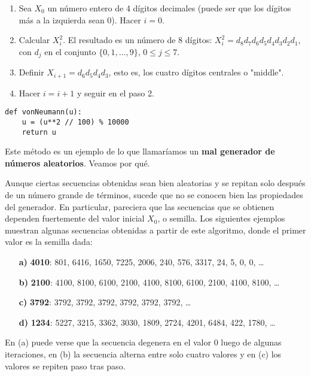 \documentclass[11pt, a4paper]{article}
\theoremstyle{definition}
\begin{document}
\begin{enumerate}
    \item Sea $X_{0}$ un número entero de 4 dígitos decimales (puede ser que los dígitos más a la izquierda sean 0). Hacer $i=0$.
    
    \item Calcular $X_{i}^{2}$. El resultado es un número de 8 dígitos: $X_{i}^{2}=d_{8}d_{7}d_{6}d_{5}d_{4}d_{3}d_{2}d_{1}$, con $d_{j}$ en el conjunto $\{0,1,\ldots,9\}$, $0\leq j\leq 7$.
    
    \item Definir $X_{i+1}=d_{6}d_{5}d_{4}d_{3}$, esto es, los cuatro dígitos centrales o "middle".
    
    \item Hacer $i=i+1$ y seguir en el paso 2.
\end{enumerate}

\begin{verbatim}
def vonNeumann(u):
    u = (u**2 // 100) % 10000
    return u
\end{verbatim}

Este método es un ejemplo de lo que llamaríamos un \textbf{mal generador de números aleatorios}. Veamos por qué.

Aunque ciertas secuencias obtenidas sean bien aleatorias y se repitan solo después de un número grande de términos, sucede que no se conocen bien las propiedades del generador. En particular, pareciera que las secuencias que se obtienen dependen fuertemente del valor inicial $X_{0}$, o semilla. Los siguientes ejemplos muestran algunas secuencias obtenidas a partir de este algoritmo, donde el primer valor es la semilla dada:

\begin{itemize}
    \item[\textbf{a)}] \textbf{4010}: 801, 6416, 1650, 7225, 2006, 240, 576, 3317, 24, 5, 0, 0, \ldots
    
    \item[\textbf{b)}] \textbf{2100}: 4100, 8100, 6100, 2100, 4100, 8100, 6100, 2100, 4100, 8100, \ldots
    
    \item[\textbf{c)}] \textbf{3792}: 3792, 3792, 3792, 3792, 3792, 3792, \ldots
    
    \item[\textbf{d)}] \textbf{1234}: 5227, 3215, 3362, 3030, 1809, 2724, 4201, 6484, 422, 1780, \ldots
\end{itemize}

En (a) puede verse que la secuencia degenera en el valor 0 luego de algunas iteraciones, en (b) la secuencia alterna entre solo cuatro valores y en (c) los valores se repiten paso tras paso.
\end{document}
